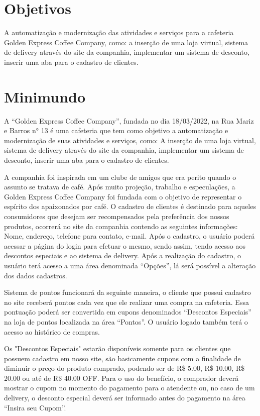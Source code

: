 \section{Objetivos}
A automatização e modernização das atividades e serviços para a cafeteria Golden Express Coffee Company, como: a inserção de uma loja virtual, sistema de delivery através do site da companhia, implementar um sistema de desconto, inserir uma aba para o cadastro de clientes.

\section{Minimundo}
A “Golden Express Coffee Company”, fundada no dia 18/03/2022, na Rua Mariz e Barros n° 13 é uma cafeteria que tem como objetivo a automatização e modernização de suas atividades e serviços, como: A inserção de uma loja virtual, sistema de delivery através do site da companhia, implementar um sistema de desconto, inserir uma aba para o cadastro de clientes.

A companhia foi inspirada em um clube de amigos que era perito quando o assunto se tratava de café. Após muito projeção, trabalho e especulações, a Golden Express Coffee Company foi fundada com o objetivo de representar o espírito dos apaixonados por café.
O cadastro de clientes é destinado para aqueles consumidores que desejam ser recompensados pela preferência dos nossos produtos, ocorrerá no site da companhia contendo as seguintes informações: Nome, endereço, telefone para contato, e-mail. Após o cadastro, o usuário poderá acessar a página do login para efetuar o mesmo, sendo assim, tendo acesso aos descontos especiais e ao sistema de delivery. Após a realização do cadastro, o usuário terá acesso a uma área denominada “Opções”, lá será possível a alteração dos dados cadastros.

Sistema de pontos funcionará da seguinte maneira, o cliente que possui cadastro no site receberá pontos cada vez que ele realizar uma compra na cafeteria. Essa pontuação poderá ser convertida em cupons denominados “Descontos Especiais” na loja de pontos localizada na área “Pontos”. O usuário logado também terá o acesso ao histórico de compras.

Os "Descontos Especiais" estarão disponíveis somente para os clientes que possuem cadastro em nosso site, são basicamente cupons com a finalidade de diminuir o preço do produto comprado, podendo ser de R\$  5.00, R\$ 10.00, R\$ 20.00 ou até de R\$ 40.00 OFF. Para o uso do benefício, o comprador deverá mostrar o cupom no momento do pagamento para o atendente ou, no caso de um delivery, o desconto especial deverá ser informado antes do pagamento na área “Insira seu Cupom”.

